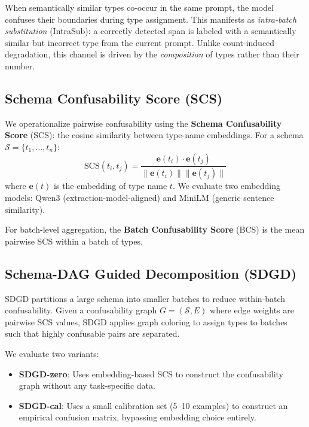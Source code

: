 \documentclass[11pt,a4paper]{article}
\begin{document}
When semantically similar types co-occur in the same prompt, the model confuses their boundaries during type assignment. This manifests as \emph{intra-batch substitution} (IntraSub): a correctly detected span is labeled with a semantically similar but incorrect type from the current prompt. Unlike count-induced degradation, this channel is driven by the \emph{composition} of types rather than their number.

\subsection{Schema Confusability Score (SCS)}

We operationalize pairwise confusability using the \textbf{Schema Confusability Score} (SCS): the cosine similarity between type-name embeddings. For a schema $\mathcal{S} = \{t_1, \ldots, t_n\}$:
\begin{equation}
\text{SCS}(t_i, t_j) = \frac{\mathbf{e}(t_i) \cdot \mathbf{e}(t_j)}{\|\mathbf{e}(t_i)\| \|\mathbf{e}(t_j)\|}
\end{equation}
where $\mathbf{e}(t)$ is the embedding of type name $t$. We evaluate two embedding models: Qwen3 (extraction-model-aligned) and MiniLM (generic sentence similarity).

For batch-level aggregation, the \textbf{Batch Confusability Score} (BCS) is the mean pairwise SCS within a batch of types.

\subsection{Schema-DAG Guided Decomposition (SDGD)}

SDGD partitions a large schema into smaller batches to reduce within-batch confusability.
Given a confusability graph $G = (\mathcal{S}, E)$ where edge weights are pairwise SCS values, SDGD applies graph coloring to assign types to batches such that highly confusable pairs are separated.

We evaluate two variants:
\begin{itemize}
\item \textbf{SDGD-zero}: Uses embedding-based SCS to construct the confusability graph without any task-specific data.
\item \textbf{SDGD-cal}: Uses a small calibration set (5--10 examples) to construct an empirical confusion matrix, bypassing embedding choice entirely.
\end{itemize}
\end{document}
